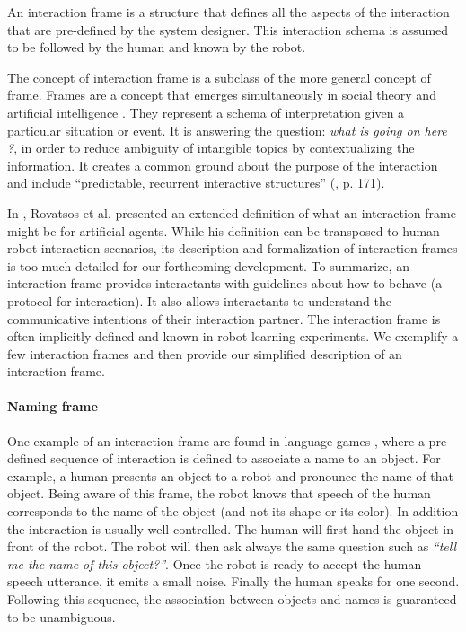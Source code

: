 An interaction frame \cite{rovatsos2001interaction} is a structure that defines all the aspects of the interaction that are pre-defined by the system designer. This interaction schema is assumed to be followed by the human and known by the robot.

The concept of interaction frame is a subclass of the more general concept of frame. Frames are a concept that emerges simultaneously in social theory \cite{goffman1974frame} and artificial intelligence \cite{minsky1974framework}. They represent a schema of interpretation given a particular situation or event. It is answering the question: \emph{what is going on here ?}, in order to reduce ambiguity of intangible topics by contextualizing the information. It creates a common ground about the purpose of the interaction \cite{tomasello2009cultural,rohlfing2013learning} and include ``predictable, recurrent interactive structures'' (\cite{ninio1996pragmatic}, p. 171). 

In \cite{rovatsos2001interaction}, Rovatsos et al. presented an extended definition of what an interaction frame might be for artificial agents. While his definition can be transposed to human-robot interaction scenarios, its description and formalization of interaction frames is too much detailed for our forthcoming development. To summarize, an interaction frame provides interactants with guidelines about how to behave (a protocol for interaction). It also allows interactants to understand the communicative intentions of their interaction partner. The interaction frame is often implicitly defined and known in robot learning experiments. We exemplify a few interaction frames and then provide our simplified description of an interaction frame.

\paragraph{Naming frame} One example of an interaction frame are found in language games \cite{steels2002aibos}, where a pre-defined sequence of interaction is defined to associate a name to an object. For example, a human presents an object to a robot and pronounce the name of that object. Being aware of this frame, the robot knows that speech of the human corresponds to the name of the object (and not its shape or its color). In addition the interaction is usually well controlled. The human will first hand the object in front of the robot. The robot will then ask always the same question such as \emph{``tell me the name of this object?''}. Once the robot is ready to accept the human speech utterance, it emits a small noise.  Finally the human speaks for one second. Following this sequence, the association between objects and names is guaranteed to be unambiguous.

